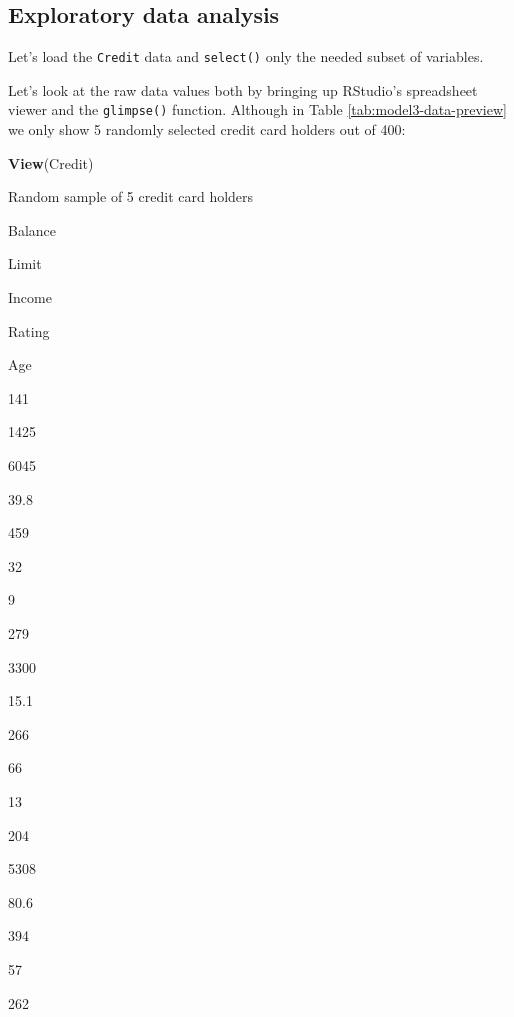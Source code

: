 \documentclass[12pt,]{krantz}
\makeatletter
\newenvironment{Shaded}{\begin{snugshade}}{\end{snugshade}}
\newcommand{\KeywordTok}[1]{\textcolor[rgb]{0.27,0.27,0.27}{\textbf{#1}}}
\newcommand{\StringTok}[1]{\textcolor[rgb]{0.5,0.5,0.5}{#1}}
\newcommand{\OperatorTok}[1]{\textcolor[rgb]{0.43,0.43,0.43}{\textbf{#1}}}
\newcommand{\NormalTok}[1]{#1}
\newenvironment{kframe}{%
\medskip{}
\setlength{\fboxsep}{.8em}
 \def\at@end@of@kframe{}%
 \ifinner\ifhmode%
  \def\at@end@of@kframe{\end{minipage}}%
  \begin{minipage}{\columnwidth}%
 \fi\fi%
 \def\FrameCommand##1{\hskip\@totalleftmargin \hskip-\fboxsep
 \colorbox{shadecolor}{##1}\hskip-\fboxsep
     \hskip-\linewidth \hskip-\@totalleftmargin \hskip\columnwidth}%
 \MakeFramed {\advance\hsize-\width
   \@totalleftmargin\z@ \linewidth\hsize
   \@setminipage}}%
 {\par\unskip\endMakeFramed%
 \at@end@of@kframe}
\renewenvironment{Shaded}{\begin{kframe}}{\end{kframe}}
\makeatother
\begin{document}
\subsection{Exploratory data analysis}\label{model3EDA}

Let's load the \texttt{Credit} data and \texttt{select()} only the
needed subset of variables.

\begin{Shaded}
\end{Shaded}

Let's look at the raw data values both by bringing up RStudio's
spreadsheet viewer and the \texttt{glimpse()} function. Although in
Table \ref{tab:model3-data-preview} we only show 5 randomly selected
credit card holders out of 400:

\begin{Shaded}
\begin{Highlighting}[]
\KeywordTok{View}\NormalTok{(Credit)}
\end{Highlighting}
\end{Shaded}

\label{tab:model3-data-preview}Random sample of 5 credit card holders

Balance

Limit

Income

Rating

Age

141

1425

6045

39.8

459

32

9

279

3300

15.1

266

66

13

204

5308

80.6

394

57

262
\end{document}
